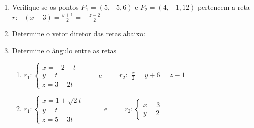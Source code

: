 \documentclass[a4paper,5pt]{amsbook}
\newcommand{\ds}{\displaystyle}
\begin{document}
\begin{enumerate}
	\vspace{0.3cm}
	\item Verifique se os pontos $P_1 = (5, -5, 6)$ e $P_2 = (4, -1, 12)$
		pertencem a reta $\displaystyle r: -(x-3) = \frac{y+1}{2} =
		-\frac{z-2}{2}$
	
	\vspace{0.3cm}
	\item Determine o vetor diretor das retas abaixo:

	
	\vspace{0.3cm}
	\item Determine o \^angulo entre as retas
	\begin{enumerate}
		\item
			$r_1:\left\{\begin{array}{l}
				x = -2 -t \\
				y = t \\
				z = 3 - 2t
			\end{array}\right.$
		\ \ \ \ \ e\ \ \ \ \ 
			$r_2:\begin{array}{l}
				\ds\frac{x}{2} = y+6 = z-1
			\end{array}$
		\item
			$r_1:\left\{\begin{array}{l}
				x = 1 + \sqrt{2}t \\
				y = t \\
				z = 5 - 3t
			\end{array}\right.$
		\ \ \ \ \ e\ \ \ \ \ 
			$r_2:\left\{\begin{array}{l}
				x = 3 \\
				y = 2
			\end{array}\right.$
	\end{enumerate}
	

\end{enumerate}
\end{document}
